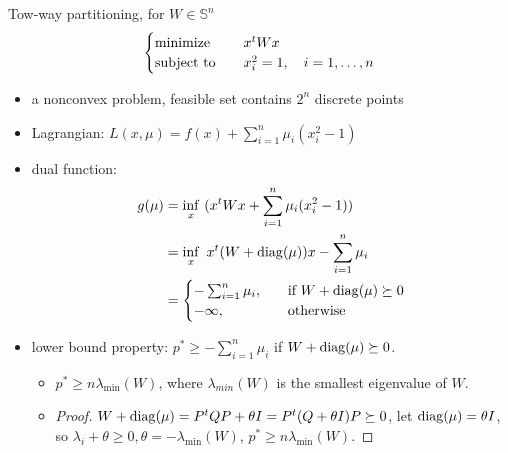 \begin{remark}
    Tow-way partitioning, for $W \in \mathbb{S}^n$ \[\begin{cases}
        \operatorname{minimize} \quad &x^tWx\\
        \operatorname{subject\ to} \quad &x_i^2 = 1, \quad i = 1, \dots, n
    \end{cases}\]
    \begin{itemize}
        \item a nonconvex problem, feasible set contains $2^n$ discrete points
        \item Lagrangian: $L(x, \mu) = f(x) + \sum_{i = 1}^n\mu_i(x_i^2 - 1)$
        \item dual function:\begin{align*}
            g(\mu) &= \inf_{x}\ (x^tWx + \sum_{i = 1}^n \mu_i(x_i^2 - 1))\\
            &= \inf_{x}\ x^t(W + \operatorname{diag}(\mu))x - \sum_{i = 1}^n\mu_i\\
            &=\begin{cases}
                -\sum_{i = 1}^n \mu_i, \quad &\text{if } W + \operatorname{diag}(\mu) \succeq 0\\
                -\infty, \quad &\text{otherwise}
            \end{cases}
        \end{align*}
        \item lower bound property: $p^* \ge -\sum_{i = 1}^n \mu_i$ if $W + \operatorname{diag}(\mu) \succeq 0$.\begin{itemize}
            \item $p^* \ge n\lambda_{\min}(W)$, where $\lambda_{min}(W)$ is the smallest eigenvalue of $W$.
            \item \begin{proof}
                $W + \operatorname{diag}(\mu) = P^tQP + \theta I = P^t(Q + \theta I)P \succeq 0$, let $\operatorname{diag}(\mu) = \theta I$, so $\lambda_i + \theta \ge 0, \theta = -\lambda_{\min}(W)$, $p^* \ge n\lambda_{\min}(W)$.
            \end{proof}
        \end{itemize}
    \end{itemize}
\end{remark}

